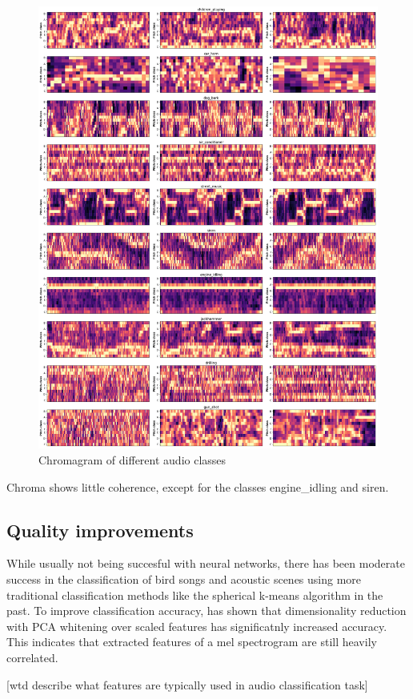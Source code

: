 \begin{figure}[H]
    \centering
	\includegraphics[width=.9\textwidth]{./images/features/chroma}
    \caption{Chromagram of different audio classes}
    \label{fig:chroma}
\end{figure}


Chroma shows little coherence, except for the classes engine_idling and siren.


\subsection{Quality improvements}
While usually not being succesful with neural networks, there has been moderate success in the classification of bird songs and acoustic scenes using more traditional classification methods like the spherical k-means algorithm in the past. To improve classification accuracy, \cite{Coates2012} has shown that dimensionality reduction with PCA whitening over scaled features has significatnly increased accuracy. 
This indicates that extracted features of a mel spectrogram are still heavily correlated.


[wtd describe what features are typically used in audio classification task]


